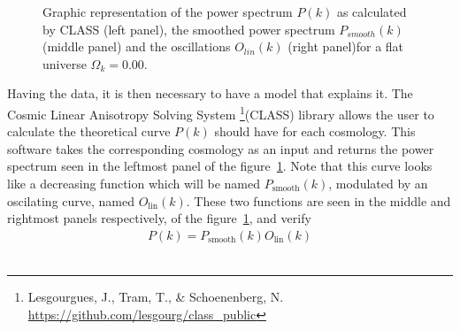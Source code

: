 \begin{figure}[t]
	\centering
\caption{Graphic representation of the power spectrum $P(k)$ as calculated by CLASS (left panel), the smoothed power spectrum $P_{smooth}(k)$ (middle panel) and the oscillations $O_{lin}(k)$ (right panel)for a flat universe $\Omega_k = 0.00$.} \label{fig:PkOlPsm} \end{figure} Having the data, it is then necessary to have a model that explains it. The Cosmic Linear Anisotropy Solving System \footnote{Lesgourgues, J., Tram, T., \& Schoenenberg, N. \url{https://github.com/lesgourg/class_public}}(CLASS)  library allows the user to calculate the theoretical curve $P(k)$ should have for each cosmology. This software takes the corresponding cosmology as an input and returns the power spectrum seen in the leftmost panel of the figure~\ref{fig:PkOlPsm}. Note that this curve looks like a decreasing function which will be named $P_{\text{smooth}}(k)$, modulated by an oscilating curve, named $O_{\text{lin}}(k)$. These two functions are seen in the middle and rightmost panels respectively, of the figure~\ref{fig:PkOlPsm}, and verify \begin{align} P(k) = P_{\text{smooth}}(k) O_{\text{lin}}(k)
	\label{eq:pk-components}
\end{align}
 \\
